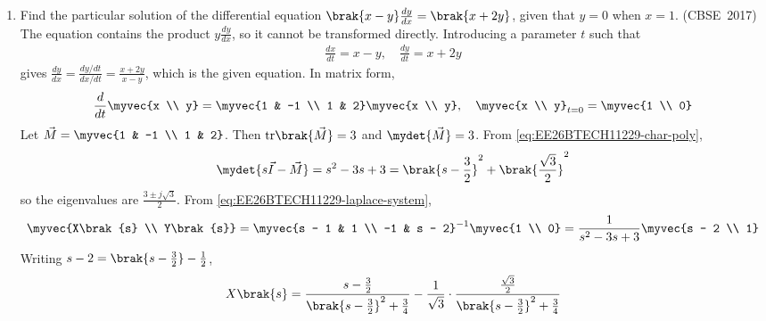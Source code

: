 \begin{enumerate}[label=\thesubsection.\arabic*, ref=\thesubsection.\theenumi]
The following code verifies the solution
\begin{lstlisting}[frame=single, basicstyle=\rmfamily, escapeinside={(*@}{@*)}]
(*@\makebox[\dimexpr\linewidth-2\fboxsep-2\fboxrule\relax][c]{codes/lineplane.py}@*)
\end{lstlisting}

\item 
Find the particular solution of the differential equation $\brak{x - y}\frac{dy}{dx} = \brak{x + 2y}$, given that $y = 0$ when $x = 1$.
\hfill (CBSE~2017)
\\
\solution
The equation contains the product $y\frac{dy}{dx}$, so it cannot be transformed directly. Introducing a parameter $t$ such that
\begin{align}
	\frac{dx}{dt} = x - y, \quad \frac{dy}{dt} = x + 2y
\end{align}
gives $\frac{dy}{dx} = \frac{dy/dt}{dx/dt} = \frac{x + 2y}{x - y}$, which is the given equation. In matrix form,
\begin{align}
	\frac{d}{dt}\myvec{x \\ y} = \myvec{1 & -1 \\ 1 & 2}\myvec{x \\ y}, \quad \myvec{x \\ y}_{t = 0} = \myvec{1 \\ 0}
\end{align}
Let $\vec{M} = \myvec{1 & -1 \\ 1 & 2}$. Then $\text{tr}\brak{\vec{M}} = 3$ and $\mydet{\vec{M}} = 3$. From \eqref{eq:EE26BTECH11229-char-poly},
\begin{align}
	\mydet{s\vec{I} - \vec{M}} = s^2 - 3s + 3 = \brak{s - \frac{3}{2}}^2 + \brak{\frac{\sqrt{3}}{2}}^2
\end{align}
so the eigenvalues are $\frac{3 \pm j\sqrt{3}}{2}$. From \eqref{eq:EE26BTECH11229-laplace-system},
\begin{align}
	\myvec{X\brak{s} \\ Y\brak{s}} = \myvec{s - 1 & 1 \\ -1 & s - 2}^{-1}\myvec{1 \\ 0}
	= \frac{1}{s^2 - 3s + 3}\myvec{s - 2 \\ 1}
\end{align}
Writing $s - 2 = \brak{s - \frac{3}{2}} - \frac{1}{2}$,
\begin{align}
	X\brak{s} &= \frac{s - \frac{3}{2}}{\brak{s - \frac{3}{2}}^2 + \frac{3}{4}} - \frac{1}{\sqrt{3}}\cdot\frac{\frac{\sqrt{3}}{2}}{\brak{s - \frac{3}{2}}^2 + \frac{3}{4}}
	\\

\end{align}
\end{enumerate}
